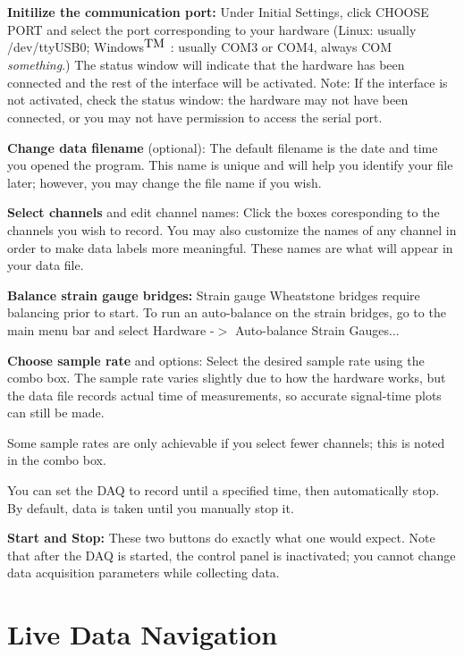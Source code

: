 \begin{DoxyEnumerate}
\item {\bfseries Initilize the communication port\-:} Under Initial Settings, click {\ttfamily C\-H\-O\-O\-S\-E} {\ttfamily P\-O\-R\-T} and select the port corresponding to your hardware (Linux\-: usually {\ttfamily /dev/tty\-U\-S\-B0}; Windows$^{\mbox{T\-M}}$ \-: usually {\ttfamily C\-O\-M3} or {\ttfamily C\-O\-M4}, always {\ttfamily C\-O\-M} {\itshape something}.) The status window will indicate that the hardware has been connected and the rest of the interface will be activated. Note\-: If the interface is not activated, check the status window\-: the hardware may not have been connected, or you may not have permission to access the serial port.
\item {\bfseries Change data filename} (optional)\-: The default filename is the date and time you opened the program. This name is unique and will help you identify your file later; however, you may change the file name if you wish.
\item {\bfseries Select channels} and edit channel names\-: Click the boxes coresponding to the channels you wish to record. You may also customize the names of any channel in order to make data labels more meaningful. These names are what will appear in your data file.
\item {\bfseries Balance strain gauge bridges\-:} Strain gauge Wheatstone bridges require balancing prior to start. To run an auto-\/balance on the strain bridges, go to the main menu bar and select {\ttfamily Hardware} -\/$>$ {\ttfamily Auto-\/balance Strain Gauges...}
\item {\bfseries Choose sample rate} and options\-: Select the desired sample rate using the combo box. The sample rate varies slightly due to how the hardware works, but the data file records actual time of measurements, so accurate signal-\/time plots can still be made.

Some sample rates are only achievable if you select fewer channels; this is noted in the combo box.

You can set the D\-A\-Q to record until a specified time, then automatically stop. By default, data is taken until you manually stop it.
\item {\bfseries Start and Stop\-:} These two buttons do exactly what one would expect. Note that after the D\-A\-Q is started, the control panel is inactivated; you cannot change data acquisition parameters while collecting data.
\end{DoxyEnumerate}\hypertarget{pd_py_gui_gui_nav}{}\section{Live Data Navigation}\label{pd_py_gui_gui_nav}
